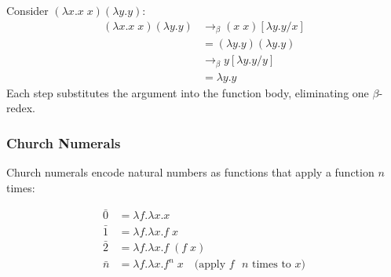 \begin{example}
Consider $(\lambda x. x\; x)(\lambda y. y)$:
\begin{align*}
(\lambda x. x\; x)(\lambda y. y)
&\to_\beta (x\; x)[\lambda y. y / x] \\
&= (\lambda y. y)(\lambda y. y) \\
&\to_\beta y[\lambda y. y / y] \\
&= \lambda y. y
\end{align*}
Each step substitutes the argument into the function body, eliminating one $\beta$-redex.
\end{example}

\subsubsection*{Church Numerals}

Church numerals encode natural numbers as functions that apply a function $n$ times:

\begin{definition}
\begin{align*}
\bar{0} &= \lambda f.\lambda x. x \\
\bar{1} &= \lambda f.\lambda x. f\; x \\
\bar{2} &= \lambda f.\lambda x. f\; (f\; x) \\
\bar{n} &= \lambda f.\lambda x. f^n\; x \quad \text{(apply $f$ $n$ times to $x$)}
\end{align*}
\end{definition}

